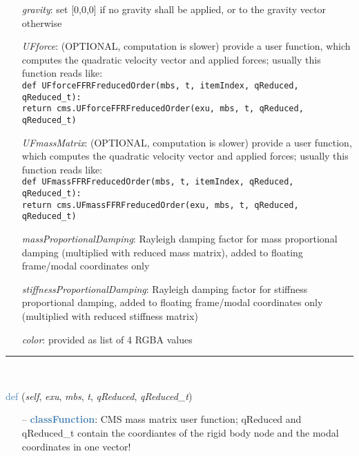 \begin{itemize}[leftmargin=1.4cm]
\begin{itemize}[leftmargin=1.4cm]
\begin{itemize}[leftmargin=0.5cm]
\begin{itemize}[leftmargin=1.4cm]
\begin{itemize}[leftmargin=1.4cm]
\begin{itemize}[leftmargin=0.5cm]
\begin{itemize}[leftmargin=0.7cm]
\begin{itemize}[leftmargin=1.2cm]
\item[]{\it gravity}: set [0,0,0] if no gravity shall be applied, or to the gravity vector otherwise
\item[]{\it UFforce}: (OPTIONAL, computation is slower) provide a user function, which computes the quadratic velocity vector and applied forces; usually this function reads like:\\ \texttt{def UFforceFFRFreducedOrder(mbs, t, itemIndex, qReduced, qReduced\_t):\\ \phantom{XXXX}return cms.UFforceFFRFreducedOrder(exu, mbs, t, qReduced, qReduced\_t)}
\item[]{\it UFmassMatrix}: (OPTIONAL, computation is slower) provide a user function, which computes the quadratic velocity vector and applied forces; usually this function reads like:\\ \texttt{def UFmassFFRFreducedOrder(mbs, t, itemIndex, qReduced, qReduced\_t):\\  \phantom{XXXX}return cms.UFmassFFRFreducedOrder(exu, mbs, t, qReduced, qReduced\_t)}
\item[]{\it massProportionalDamping}: Rayleigh damping factor for mass proportional damping (multiplied with reduced mass matrix), added to floating frame/modal coordinates only
\item[]{\it stiffnessProportionalDamping}: Rayleigh damping factor for stiffness proportional damping, added to floating frame/modal coordinates only (multiplied with reduced stiffness matrix)
\item[]{\it color}: provided as list of 4 RGBA values
\end{itemize}
\vspace{12pt}\end{itemize}
%
\noindent\rule{8cm}{0.75pt}\vspace{1pt} \\ 
\begin{flushleft}
\noindent \textcolor{steelblue}{def {\bf {}}}\label{sec:FEM:ObjectFFRFreducedOrderInterface:UFmassFFRFreducedOrder}
({\it self}, {\it exu}, {\it mbs}, {\it t}, {\it qReduced}, {\it qReduced\_t})
\end{flushleft}
\setlength{\itemindent}{0.7cm}
\begin{itemize}[leftmargin=0.7cm]
\item[--]\textcolor{steelblue}{\bf classFunction}: CMS mass matrix user function; qReduced and qReduced\_t contain the coordiantes of the rigid body node and the modal coordinates in one vector!

\end{itemize}
\end{itemize}
\end{itemize}
\end{itemize}
\end{itemize}
\end{itemize}
\end{itemize}
